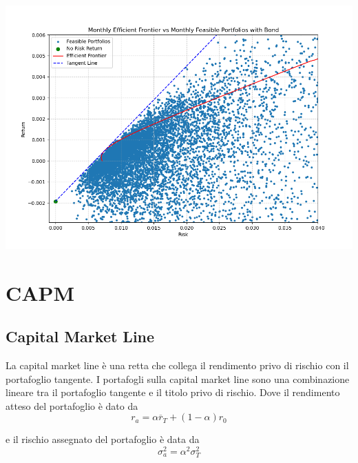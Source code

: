 \documentclass[compress]{beamer}
\begin{document}
\begin{frame}{\subsecname}
\begin{minipage}{0.30\textwidth}
		\includegraphics[width=0.95\linewidth]{images/Monthly Efficient Frontier vs Monthly Feasible Portfolios with Bond.png}
	\end{minipage}
\end{frame}

\section{CAPM}

\subsection{Capital Market Line}
\begin{frame}{\subsecname}
	La capital market line è una retta che collega il rendimento privo di rischio con il portafoglio tangente.
	I portafogli sulla capital market line sono una combinazione lineare tra il portafoglio tangente e il titolo privo di rischio. Dove il rendimento atteso del portafoglio è dato da
	\[
		r_a = \alpha \overline{r}_T + (1 - \alpha) r_0
	\]

	e il rischio assegnato del portafoglio è data da
	\[
		\sigma_a^2 = \alpha^2 \sigma_T^2 
	\]
\end{frame}
\end{document}
